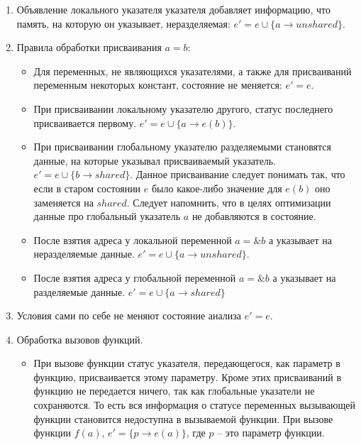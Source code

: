 \begin{enumerate}
\item Объявление локального указателя указателя добавляет информацию, что память, на которую он указывает, неразделяемая: $e' = e \cup \{a \to unshared\}$.

\item Правила обработки присваивания $a = b$:
\begin{itemize}

\item Для переменных, не являющихся указателями, а также для присваиваний переменным некоторых констант, состояние не меняется: $e' = e$.

\item При присваивании локальному указателю другого, статус последнего присваивается первому.
$e' = e \cup \{a \to e(b)\}$.

\item При присваивании глобальному указателю разделяемыми становятся данные, на которые указывал присваиваемый указатель.
$e' = e \cup \{b \to shared\}$.
Данное присваивание следует понимать так, что если в старом состоянии $e$ было какое-либо значение для $e(b)$ оно заменяется на $shared$.
Следует напомнить, что в целях оптимизации данные про глобальный указатель $a$ не добавляются в состояние.

\item После взятия адреса у локальной переменной $a = \&b$ $а$ указывает на неразделяемые данные.
$e' = e \cup \{a \to unshared\}$.

\item После взятия адреса у глобальной переменной $a = \&b$ $а$ указывает на разделяемые данные.
$e' = e \cup \{a \to shared\}$
\end{itemize}

\item Условия сами по себе не меняют состояние анализа $e' = e$.

\item Обработка вызовов функций. 
\begin{itemize}
\item При вызове функции статус указателя, передающегося, как параметр в функцию, присваивается этому параметру.
Кроме этих присваиваний в функцию не передается ничего, так как глобальные указатели не сохраняются.
То есть вся информация о статусе переменных вызывающей функции становится недоступна в вызываемой функции.
При вызове функции $f(a)$, $e' = \{p \to e(a)\}$, где $p$ -- это параметр функции.


\end{itemize}
\end{enumerate}
